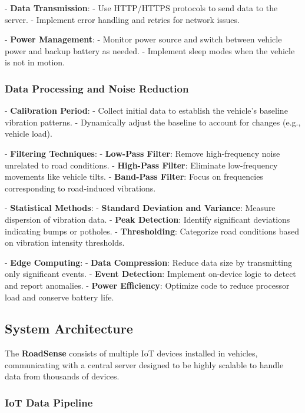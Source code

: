 \documentclass[12pt,a4paper]{article}
\begin{document}
- \textbf{Data Transmission}:
  - Use HTTP/HTTPS protocols to send data to the server.
  - Implement error handling and retries for network issues.

- \textbf{Power Management}:
  - Monitor power source and switch between vehicle power and backup battery as needed.
  - Implement sleep modes when the vehicle is not in motion.

\subsubsection*{Data Processing and Noise Reduction}

- \textbf{Calibration Period}:
  - Collect initial data to establish the vehicle's baseline vibration patterns.
  - Dynamically adjust the baseline to account for changes (e.g., vehicle load).

- \textbf{Filtering Techniques}:
  - \textbf{Low-Pass Filter}: Remove high-frequency noise unrelated to road conditions.
  - \textbf{High-Pass Filter}: Eliminate low-frequency movements like vehicle tilts.
  - \textbf{Band-Pass Filter}: Focus on frequencies corresponding to road-induced vibrations.

- \textbf{Statistical Methods}:
  - \textbf{Standard Deviation and Variance}: Measure dispersion of vibration data.
  - \textbf{Peak Detection}: Identify significant deviations indicating bumps or potholes.
  - \textbf{Thresholding}: Categorize road conditions based on vibration intensity thresholds.

- \textbf{Edge Computing}:
  - \textbf{Data Compression}: Reduce data size by transmitting only significant events.
  - \textbf{Event Detection}: Implement on-device logic to detect and report anomalies.
  - \textbf{Power Efficiency}: Optimize code to reduce processor load and conserve battery life.

\subsection*{System Architecture}

The \textbf{RoadSense} consists of multiple IoT devices installed in vehicles, communicating with a central server designed to be highly scalable to handle data from thousands of devices.

\subsubsection*{IoT Data Pipeline}
\end{document}
